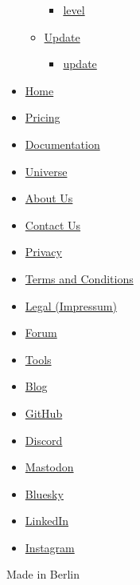 \begin{itemize}
\begin{itemize}
    \begin{itemize}
    \tightlist
    \item
      \hyperref[definitions-step-level]{level}
    \end{itemize}
  \item
    \hyperref[definitions-update]{Update}

    \begin{itemize}
    \tightlist
    \item
      \hyperref[definitions-update-update]{update}
    \end{itemize}
  \end{itemize}
\end{itemize}

\begin{itemize}
\tightlist
\item
  \href{/}{Home}
\item
  \href{/pricing/}{Pricing}
\item
  \href{/docs/}{Documentation}
\item
  \href{/universe/}{Universe}
\item
  \href{/about/}{About Us}
\item
  \href{/contact/}{Contact Us}
\item
  \href{/privacy/}{Privacy}
\item
  \href{https://typst.app/terms}{Terms and Conditions}
\item
  \href{/legal/}{Legal (Impressum)}
\end{itemize}

\begin{itemize}
\tightlist
\item
  \href{https://forum.typst.app}{Forum}
\item
  \href{/tools/}{Tools}
\item
  \href{/blog/}{Blog}
\item
  \href{https://github.com/typst/}{GitHub}
\item
  \href{https://discord.gg/2uDybryKPe}{Discord}
\item
  \href{https://mastodon.social/@typst}{Mastodon}
\item
  \href{https://bsky.app/profile/typst.app}{Bluesky}
\item
  \href{https://www.linkedin.com/company/typst/}{LinkedIn}
\item
  \href{https://instagram.com/typstapp/}{Instagram}
\end{itemize}

Made in Berlin
